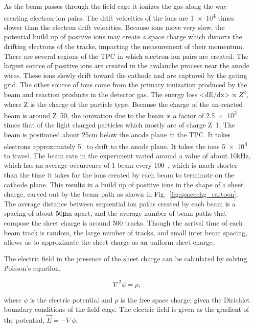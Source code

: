 As the beam passes through the field cage it ionizes the gas along the way creating electron-ion pairs. The drift velocities of the ions are \num{1e4} times slower than the electron drift velocities. Because ions move very slow, the potential build up of positive ions may create a space charge which distorts the drifting electrons of the tracks, impacting the measurement of their momentum. There are several regions of the TPC in which electron-ion pairs are created. The largest source of positive ions are created in the avalanche process near the anode wires. These ions slowly drift toward the cathode and are captured by the gating grid. The other source of ions come from the primary ionization produced by the beam and reaction products in the detector gas. The energy loss <dE/dx>$\propto Z^2$, where Z is the charge of the particle type. Because the charge of the un-reacted beam is around Z~50, the ionization due to the beam is a factor of \num{2.5e3} times that of the light charged particles which mostly are of charge Z~1. 
 The beam is positioned about 25\si{\centi\metre} below the anode plane in the TPC. It takes electrons approximately 5\si{\micro\sec} to drift to the anode plane. It takes the ions \num{5e4}\si{\micro\sec} to travel. The beam rate in the experiment varied around a value of about 10\si{\kilo\hertz}, which has an average occurrence of 1 beam every 100\si{\micro\sec}, which is much shorter than the time it takes for the ions created by each beam to terminate on the cathode plane. This results in a build up of positive ions in the shape of a sheet charge, carved out by the beam path as shown in Fig.~\ref{fig:spacechg_cartoon}. The average distance between sequential ion paths created by each beam is a spacing of about 50\si{\micro\metre} apart, and the average number of beam paths that compose the sheet charge is around 500 tracks. 
Though the arrival time of each beam track is random, the large number of tracks, and small inter beam spacing, allows us to approximate the sheet charge as an uniform sheet charge. 

The electric field in the presence of the sheet charge can be calculated by solving Poisson's equation, 

\begin{equation}
\nabla^2 \phi = \rho,
\end{equation}

 where $\phi$ is the electric potential and $\rho$ is the free space charge; given the Dirichlet boundary conditions of the field cage. The electric field is given as the gradient of the potential,  $\vec{E}= -\nabla \phi$. 
 
